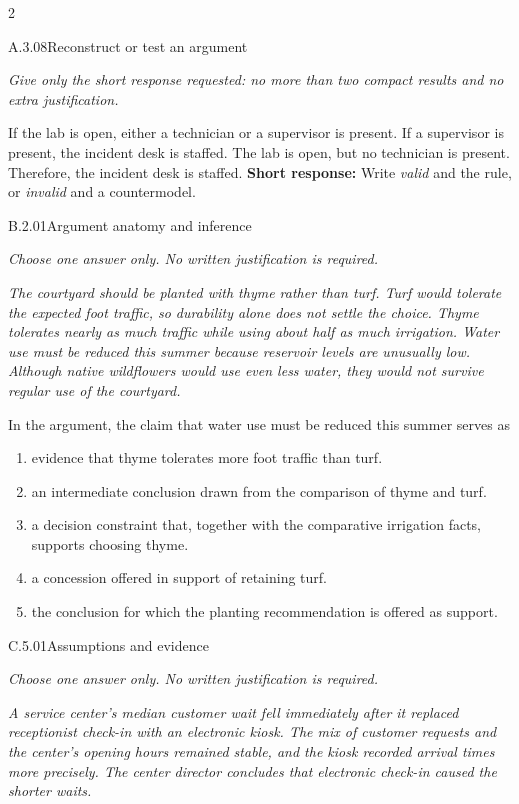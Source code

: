 \documentclass[9pt]{extarticle}
\newcommand{\choice}[1]{\item #1}
\begin{document}
\begin{multicols}{2}
\begin{DenseCoreProblem}{A.3.08}{Reconstruct or test an argument}
{\scriptsize\textit{Give only the short response requested: no more than two compact results and no extra justification.}\par}
If the lab is open, either a technician or a supervisor is present. If a supervisor is present, the incident desk is staffed. The lab is open, but no technician is present. Therefore, the incident desk is staffed.
\textbf{Short response:} Write \emph{valid} and the rule, or \emph{invalid} and a countermodel.
\end{DenseCoreProblem}
\begin{DenseCoreProblem}{B.2.01}{Argument anatomy and inference}
{\scriptsize\textit{Choose one answer only. No written justification is required.}\par}
\emph{The courtyard should be planted with thyme rather than turf. Turf would tolerate the expected foot traffic, so durability alone does not settle the choice. Thyme tolerates nearly as much traffic while using about half as much irrigation. Water use must be reduced this summer because reservoir levels are unusually low. Although native wildflowers would use even less water, they would not survive regular use of the courtyard.}

In the argument, the claim that water use must be reduced this summer serves as
\begin{enumerate}[label=(\alph*)]
  \choice{evidence that thyme tolerates more foot traffic than turf.}
  \choice{an intermediate conclusion drawn from the comparison of thyme and turf.}
  \choice{a decision constraint that, together with the comparative irrigation facts, supports choosing thyme.}
  \choice{a concession offered in support of retaining turf.}
  \choice{the conclusion for which the planting recommendation is offered as support.}
\end{enumerate}
\end{DenseCoreProblem}
\columnbreak
\begin{DenseCoreProblem}{C.5.01}{Assumptions and evidence}
{\scriptsize\textit{Choose one answer only. No written justification is required.}\par}
\emph{A service center's median customer wait fell immediately after it replaced receptionist check-in with an electronic kiosk. The mix of customer requests and the center's opening hours remained stable, and the kiosk recorded arrival times more precisely. The center director concludes that electronic check-in caused the shorter waits.}


\end{DenseCoreProblem}
\end{multicols}
\end{document}
